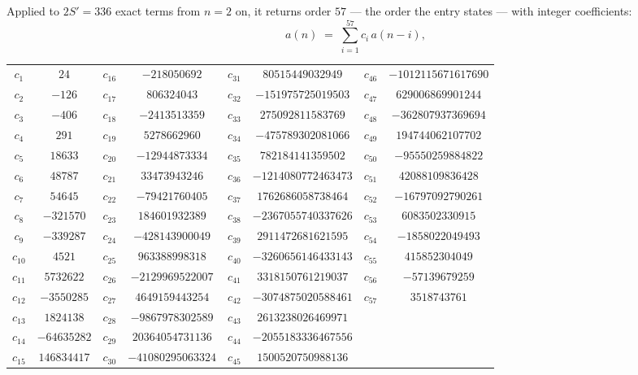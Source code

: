 \documentclass[11pt,a4paper]{article}
\theoremstyle{plain}
\theoremstyle{definition}
\begin{document}
Applied to $2S'=336$ exact terms from $n=2$ on, it returns order $57$ --- the
order the entry states --- with integer coefficients:
\[
a(n)\;=\;\sum_{i=1}^{57}c_i\,a(n-i),
\]
\begin{center}\small
\begin{tabular}{cccccccc}
$c_{1}$ & $24$ & $c_{16}$ & $-218050692$ & $c_{31}$ & $80515449032949$ & $c_{46}$ & $-1012115671617690$ \\
$c_{2}$ & $-126$ & $c_{17}$ & $806324043$ & $c_{32}$ & $-151975725019503$ & $c_{47}$ & $629006869901244$ \\
$c_{3}$ & $-406$ & $c_{18}$ & $-2413513359$ & $c_{33}$ & $275092811583769$ & $c_{48}$ & $-362807937369694$ \\
$c_{4}$ & $291$ & $c_{19}$ & $5278662960$ & $c_{34}$ & $-475789302081066$ & $c_{49}$ & $194744062107702$ \\
$c_{5}$ & $18633$ & $c_{20}$ & $-12944873334$ & $c_{35}$ & $782184141359502$ & $c_{50}$ & $-95550259884822$ \\
$c_{6}$ & $48787$ & $c_{21}$ & $33473943246$ & $c_{36}$ & $-1214080772463473$ & $c_{51}$ & $42088109836428$ \\
$c_{7}$ & $54645$ & $c_{22}$ & $-79421760405$ & $c_{37}$ & $1762686058738464$ & $c_{52}$ & $-16797092790261$ \\
$c_{8}$ & $-321570$ & $c_{23}$ & $184601932389$ & $c_{38}$ & $-2367055740337626$ & $c_{53}$ & $6083502330915$ \\
$c_{9}$ & $-339287$ & $c_{24}$ & $-428143900049$ & $c_{39}$ & $2911472681621595$ & $c_{54}$ & $-1858022049493$ \\
$c_{10}$ & $4521$ & $c_{25}$ & $963388998318$ & $c_{40}$ & $-3260656146433143$ & $c_{55}$ & $415852304049$ \\
$c_{11}$ & $5732622$ & $c_{26}$ & $-2129969522007$ & $c_{41}$ & $3318150761219037$ & $c_{56}$ & $-57139679259$ \\
$c_{12}$ & $-3550285$ & $c_{27}$ & $4649159443254$ & $c_{42}$ & $-3074875020588461$ & $c_{57}$ & $3518743761$ \\
$c_{13}$ & $1824138$ & $c_{28}$ & $-9867978302589$ & $c_{43}$ & $2613238026469971$ &  &  \\
$c_{14}$ & $-64635282$ & $c_{29}$ & $20364054731136$ & $c_{44}$ & $-2055183336467556$ &  &  \\
$c_{15}$ & $146834417$ & $c_{30}$ & $-41080295063324$ & $c_{45}$ & $1500520750988136$ &  &  \\
\end{tabular}
\end{center}
\end{document}

